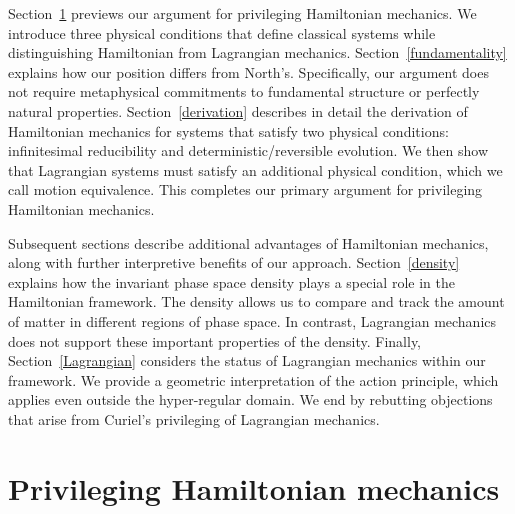 \documentclass[12pt, english, twoside]{article} %
\begin{document}
Section~\ref{privileging} previews our argument for privileging Hamiltonian mechanics. We introduce three physical conditions that define classical systems while distinguishing Hamiltonian from Lagrangian mechanics. Section~\ref{fundamentality} explains how our position differs from North's. Specifically, our argument does not require metaphysical commitments to fundamental structure or perfectly natural properties. Section~\ref{derivation} describes in detail the derivation of Hamiltonian mechanics for systems that satisfy two physical conditions: infinitesimal reducibility and deterministic/reversible evolution. We then show that Lagrangian systems must satisfy an additional physical condition, which we call motion equivalence. This completes our primary argument for privileging Hamiltonian mechanics.

Subsequent sections describe additional advantages of Hamiltonian mechanics, along with further interpretive benefits of our approach. Section~\ref{density} explains how the invariant phase space density plays a special role in the Hamiltonian framework. The density allows us to compare and track the amount of matter in different regions of phase space. In contrast, Lagrangian mechanics does not support these important properties of the density. Finally, Section~\ref{Lagrangian} considers the status of Lagrangian mechanics within our framework. We provide a geometric interpretation of the action principle, which applies even outside the hyper-regular domain. We end by rebutting objections that arise from Curiel's \parencites*[]{Curiel} privileging of Lagrangian mechanics. 



\section{Privileging Hamiltonian mechanics}
\label{privileging}
\end{document}
